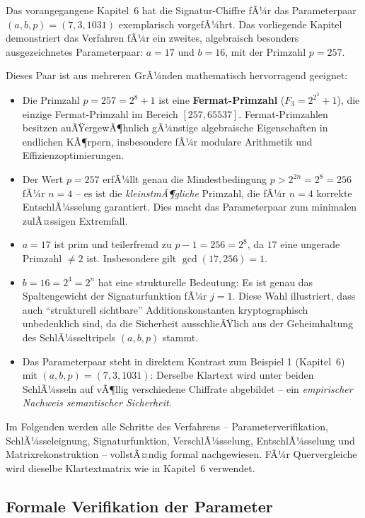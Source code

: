 ﻿\documentclass[a4paper,12pt]{scrreprt}
\theoremstyle{definition}
\begin{document}
Das vorangegangene Kapitel~6 hat die Signatur-Chiffre fÃ¼r das Parameterpaar $(a, b, p) = (7, 3, 1031)$ exemplarisch vorgefÃ¼hrt. Das vorliegende Kapitel demonstriert das Verfahren fÃ¼r ein zweites, algebraisch besonders ausgezeichnetes Parameterpaar: $a = 17$ und $b = 16$, mit der Primzahl $p = 257$.

Dieses Paar ist aus mehreren GrÃ¼nden mathematisch hervorragend geeignet:

\begin{itemize}
  \item Die Primzahl $p = 257 = 2^8 + 1$ ist eine \textbf{Fermat-Primzahl} ($F_3 = 2^{2^3} + 1$), die einzige Fermat-Primzahl im Bereich $[257, 65537]$. Fermat-Primzahlen besitzen auÃŸergewÃ¶hnlich gÃ¼nstige algebraische Eigenschaften in endlichen KÃ¶rpern, insbesondere fÃ¼r modulare Arithmetik und Effizienzoptimierungen.
  \item Der Wert $p = 257$ erfÃ¼llt genau die Mindestbedingung $p > 2^{2n} = 2^8 = 256$ fÃ¼r $n = 4$ -- es ist die \emph{kleinstmÃ¶gliche} Primzahl, die fÃ¼r $n = 4$ korrekte EntschlÃ¼sselung garantiert. Dies macht das Parameterpaar zum minimalen zulÃ¤ssigen Extremfall.
  \item $a = 17$ ist prim und teilerfremd zu $p - 1 = 256 = 2^8$, da $17$ eine ungerade Primzahl $\neq 2$ ist. Insbesondere gilt $\gcd(17, 256) = 1$.
  \item $b = 16 = 2^4 = 2^n$ hat eine strukturelle Bedeutung: Es ist genau das Spaltengewicht der Signaturfunktion fÃ¼r $j = 1$. Diese Wahl illustriert, dass auch ``strukturell sichtbare'' Additionskonstanten kryptographisch unbedenklich sind, da die Sicherheit ausschlieÃŸlich aus der Geheimhaltung des SchlÃ¼sseltripels $(a, b, p)$ stammt.
  \item Das Parameterpaar steht in direktem Kontrast zum Beispiel 1 (Kapitel~6) mit $(a, b, p) = (7, 3, 1031)$: Derselbe Klartext wird unter beiden SchlÃ¼sseln auf vÃ¶llig verschiedene Chiffrate abgebildet -- ein \emph{empirischer Nachweis semantischer Sicherheit}.
\end{itemize}

Im Folgenden werden alle Schritte des Verfahrens -- Parameterverifikation, SchlÃ¼sseleignung, Signaturfunktion, VerschlÃ¼sselung, EntschlÃ¼sselung und Matrixrekonstruktion -- vollstÃ¤ndig formal nachgewiesen. FÃ¼r Quervergleiche wird dieselbe Klartextmatrix wie in Kapitel~6 verwendet.

\subsection{Formale Verifikation der Parameter}
\end{document}
